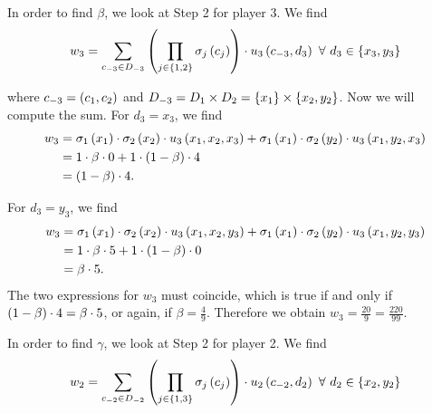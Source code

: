 \begin{enumerate} [label=\Alph*. ]
	      	              
	      In order to find $\beta$, we look at Step 2 for player 3. We find
	      \begin{equation*}
	      	w_3 = \sum_{c_{-3} \in D_{-3}} \parent{\prod_{j \in \bracket{1,2}} \sigma_{j} \parent{c_{j}} } \cdot u_{3} \parent{c_{-3}, d_3} \ \forall \ d_{3} \in \bracket{x_3, y_3}
	      \end{equation*}
	      	              
	      where $c_{-3} = \left(c_1, c_2\right)$ and $D_{-3} = D_{1} \times D_{2} = \left\{x_1\right\} \times \left\{x_2, y_2\right\}$.
	      Now we will compute the sum.
	      For $d_3 = x_3$, we find
	      \begin{align*}
	      	w_3
	      	  & = \sigma_{1} \left(x_{1}\right) \cdot \sigma_{2} \left(x_{2}\right) \cdot u_{3} \left(x_1, x_2, x_3\right) 
	      	+  \sigma_{1} \left(x_{1}\right) \cdot \sigma_{2} \left(y_{2}\right) \cdot u_{3} \left(x_1, y_2, x_3\right) \\
	      	  & = 1 \cdot \beta \cdot 0                                                                        
	      	+  1 \cdot \left(1 - \beta\right) \cdot 4 \\
	      	  & = \left(1 - \beta\right) \cdot 4.                                                                  
	      \end{align*}
	      	              
	      For $d_3 = y_3$, we find
	      \begin{align*}
	      	w_3
	      	  & = \sigma_{1} \left(x_{1}\right) \cdot \sigma_{2} \left(x_{2}\right) \cdot u_{3} \left(x_1, x_2, y_3\right) 
	      	+  \sigma_{1} \left(x_{1}\right) \cdot \sigma_{2} \left(y_{2}\right) \cdot u_{3} \left(x_1, y_2, y_3\right) \\
	      	  & = 1 \cdot \beta \cdot 5                                                                        
	      	+  1 \cdot \left(1 - \beta\right) \cdot 0 \\
	      	  & = \beta \cdot 5.                                                                               
	      \end{align*}
	      The two expressions for $w_3$ must coincide, which is true if and only if $\left(1 - \beta\right) \cdot 4 = \beta \cdot 5$, or again, if $\beta = \frac{4}{9}$.
	      Therefore we obtain $w_3 = \frac{20}{9} = \frac{220}{99}$.
	      	              
	      	              
	      	              
	      In order to find $\gamma$, we look at Step 2 for player 2. We find
	      \begin{equation*}
	      	w_2 = \sum_{c_{-2} \in D_{-2}} \parent{\prod_{j \in \bracket{1,3}} \sigma_{j} \parent{c_{j}} } \cdot u_{2} \parent{c_{-2}, d_2} \ \forall \ d_{2} \in \bracket{x_2, y_2}
	      \end{equation*}
	      	              

\end{enumerate}
